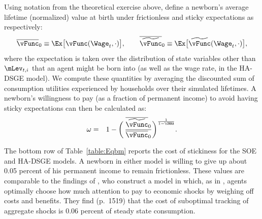 \documentclass[titlepage]{\econtex}\newcommand{\texname}{cAndCwithStickyE}
\begin{document}
Using notation from the theoretical exercise above, define a newborn's average lifetime (normalized) value at birth under frictionless and sticky expectations as respectively:
\begin{equation*}
\overline{\vFunc}_0 \equiv \Ex \big[ \vFunc(\Wage_t,\cdot)\big], \qquad \overline{\perc{\vFunc}}_0 \equiv \Ex \big[ \perc{\vFunc}(\Wage_t,\cdot)\big],
\end{equation*}
where the expectation is taken over the distribution of state variables other than $\mLev_{t,i}$ that an agent might be born into (as well as the wage rate, in the HA-DSGE model).  We compute these quantities by averaging the discounted sum of consumption utilities experienced by households over their simulated lifetimes.  A newborn's willingness to pay (as a fraction of permanent income) to avoid having sticky expectations can then be calculated as:
\begin{eqnarray}\label{eq:WTP}
\omega & = & 1 - \bigg(\,\frac{\overline{\perc{\vFunc}}_0}{\overline{\vFunc}_0} \bigg)^{\frac{1}{1-\CRRA}}.
\end{eqnarray}

The bottom row of Table~\ref{table:Eqbm} reports the cost of stickiness for the SOE and HA-DSGE models.  A newborn in either model is willing to give up about 0.05 percent of his permanent income to remain frictionless.  These values are comparable to the findings of \cite{mackWiedREStud15}, who construct a model in which, as in \cite{reis:inattentive}, agents optimally choose how much attention to pay to economic shocks by weighing off costs and benefits.  They find (p.\ 1519) that the cost of suboptimal tracking of aggregate shocks is 0.06 percent of steady state consumption. %
\end{document}
